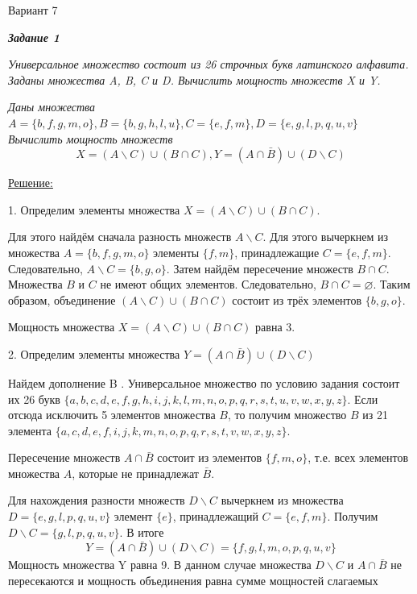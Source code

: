 \documentclass[11pt]{article}
\let\emptyset\varnothing
\begin{document}
	\begin{center}
	Вариант 7
	\end{center}
	
	\textit{\textbf{Задание 1}}

	\textit{Универсальное множество состоит из 26 строчных букв латинского
алфавита. Заданы множества A, B, C и D. Вычислить мощность множеств X
и Y.}

\textit{Даны множества
$A=\{b,f,g,m,o\}, B=\{b,g,h,l,u\}, C=\{e,f,m\}, D=\{e,g,l,p,q,u,v\}$\\
Вычислить мощность множеств}
$$X = (A \backslash C) \cup (B \cap C),
Y=(A \cap \bar B) \cup (D \backslash C) $$

\underline{Решение:}

1. Определим элементы множества 
$X = (A \backslash C) \cup (B \cap C)$.

Для этого найдём сначала разность множеств $A \backslash C$.
Для этого вычеркнем из множества $A=\{b,f,g,m,o\}$ элементы
$\{f, m\}$, принадлежащие $C=\{e,f,m\}$. Следовательно,
$A \backslash C = \{b, g, o\}$.
Затем найдём пересечение множеств $B \cap C$.
Множества $B$ и $C$ не имеют общих элементов. Следовательно,
$B \cap C = \emptyset$.
Таким образом, объединение $(A \backslash C) \cup (B \cap C)$ состоит из
трёх элементов $\{b, g, o\}$.

Мощность множества 
$X = (A \backslash C) \cup (B \cap C)$ равна 3.

2. Определим элементы множества 
$Y=(A \cap \bar B) \cup (D \backslash C)$

Найдем дополнение B . Универсальное множество по условию задания
состоит их 26 букв
$\{a,b,c,d,e,f,g,h,i,j,k,l,m,n,o,p,q,r,s,t,u,v,w,x,y,z\}$.
Если отсюда исключить 5 элементов множества $B$, то получим множество
$B$ из 21 элемента
$\{a,c,d,e,f,i,j,k,m,n,o,p,q,r,s,t,v,w,x,y,z\}$.

Пересечение множеств $A \cap \bar B$
состоит из элементов $\{f, m, o\}$, т.е. всех
элементов множества $A$, которые не принадлежат $\bar B$.

Для нахождения разности множеств $D \backslash C$ вычеркнем из множества
$D=\{e,g,l,p,q,u,v\}$
элемент $\{e\}$, принадлежащий
$C=\{e,f,m\}$. Получим
$D \backslash C = \{g, l, p, q, u, v\}$. В итоге\\
$$Y=(A \cap \bar B) \cup (D \backslash C) = \{f,g,l,m,o,p,q,u,v\}$$
Мощность множества Y равна 9. В данном случае множества $D \backslash C$
и $A \cap \bar B$ не пересекаются и мощность объединения равна
сумме мощностей слагаемых
\end{document}
